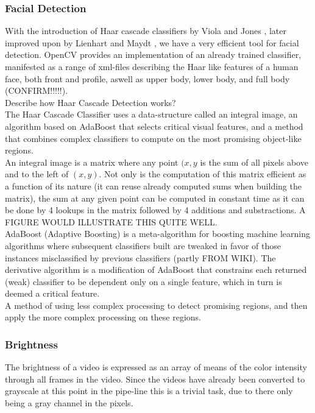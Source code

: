\subsubsection{Facial Detection}
%
With the introduction of Haar cascade classifiers by Viola and Jones \cite{viola01}, later improved upon by Lienhart and Maydt \cite{lienhart01}, we have a very efficient tool for facial detection. OpenCV provides an implementation of an already trained classifier, manifested as a range of xml-files describing the Haar like features of a human face, both front and profile, aswell as upper body, lower body, and full body (CONFIRM!!!!!).\\
Describe how Haar Cascade Detection works?\\
The Haar Cascade Classifier uses a data-structure called an integral image, an algorithm based on AdaBoost that selects critical visual features, and a method that combines complex classifiers to compute on the most promising object-like regions.\\
An integral image is a matrix where any point $(x,y$ is the sum of all pixels above and to the left of $(x,y)$. Not only is the computation of this matrix efficient as a function of its nature (it can reuse already computed sums when building the matrix), the sum at any given point can be computed in constant time as it can be done by 4 lookups in the matrix followed by 4 additions and substractions. A FIGURE WOULD ILLUSTRATE THIS QUITE WELL.\\
AdaBoost (Adaptive Boosting) is a meta-algorithm for boosting machine learning algorithms where subsequent classifiers built are tweaked in favor of those instances misclassified by previous classifiers (partly FROM WIKI). The derivative algorithm is a modification of AdaBoost that constrains each returned (weak) classifier to be dependent only on a single feature, which in turn is deemed a critical feature.\\
A method of using less complex processing to detect promising regions, and then apply the more complex processing on these regions.
%
\subsubsection{Brightness}
%
The brightness of a video is expressed as an array of means of the color intensity through all frames in the video. Since the videos have already been converted to grayscale at this point in the pipe-line this is a trivial task, due to there only being a gray channel in the pixels.
%
